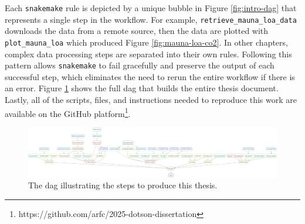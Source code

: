 Each \texttt{snakemake} rule is depicted by a unique bubble in Figure
\ref{fig:intro-dag} that represents a single step in the workflow. For example,
\texttt{retrieve\_mauna\_loa\_data} downloads the data from a remote source,
then the data are plotted with \texttt{plot\_mauna\_loa} which produced Figure
\ref{fig:mauna-loa-co2}. In other chapters, complex data processing steps are
separated into their own rules. Following this pattern allows \texttt{snakemake}
to fail gracefully and preserve the output of each successful step, which
eliminates the need to rerun the entire workflow if there is an error. Figure
\ref{fig:dag} shows the full \ac{dag} that builds the entire thesis document.
Lastly, all of the scripts, files, and instructions needed to reproduce this
work are available on the GitHub
platform\footnote{https://github.com/arfc/2025-dotson-dissertation}.

    \begin{figure}
            \centering
            \includegraphics[width=\columnwidth]{../analysis/dag.png}
            \caption{The \ac{dag} illustrating the steps to produce this
            thesis.}
            \label{fig:dag}
    \end{figure}

